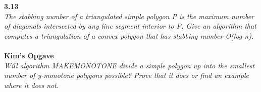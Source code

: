\textbf{3.13}\\
\noindent
\textit{The stabbing number of a triangulated simple polygon P is the maximum
	number of diagonals intersected by any line segment interior to P. Give
	an algorithm that computes a triangulation of a convex polygon that has
	stabbing number O(log n).}
\\\\
\noindent
\textbf{Kim's Opgave}\\
\noindent
\textit{Will algorithm MAKEMONOTONE divide a simple polygon up into the smallest number of y-monotone polygons possible? Prove that it does or find an example where it does not. }



